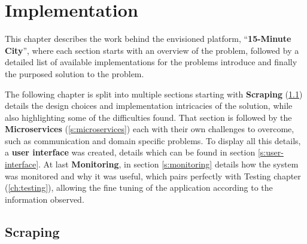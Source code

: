 \chapter{Implementation}
\label{ch:15mc}

This chapter describes the work behind the envisioned platform, ``\textbf{15-Minute City}'', where each section starts with an overview of the problem, followed by a detailed list of available implementations for the problems introduce and finally the purposed solution to the problem.

The following chapter is split into multiple sections starting with \textbf{Scraping} (\ref{s:scraping}) details the design choices and implementation intricacies of the solution, while also highlighting some of the difficulties found. That section is followed by the \textbf{Microservices} (\ref{s:microservices}) each with their own challenges to overcome, such as communication and domain specific problems. To display all this details, a \textbf{user interface} was created, details which can be found in section \ref{s:user-interface}. At last \textbf{Monitoring}, in section \ref{s:monitoring} details how the system was monitored and why it was useful, which pairs perfectly with Testing chapter (\ref{ch:testing}), allowing the fine tuning of the application according to the information observed.
    



\section{Scraping}
\label{s:scraping}

